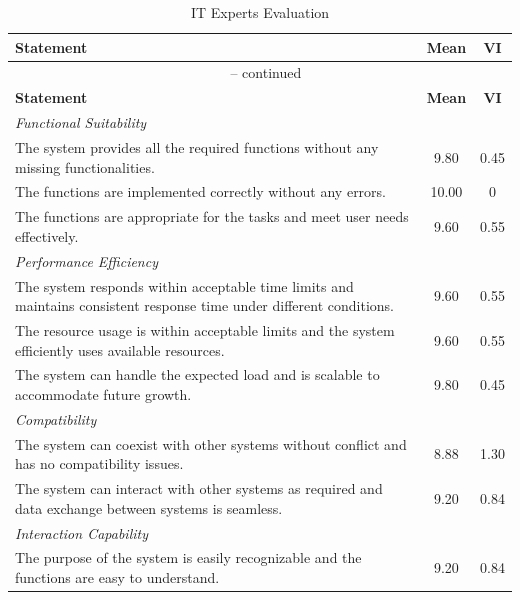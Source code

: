 \begin{appendices}
\begin{centerappendixtitle}
\begin{spacing}{1.3}
\begin{longtable}{p{12cm}cc}
	    \end{longtable}
		\end{spacing}
        
        \pagebreak
        \begin{spacing}{1.3}
		\begin{longtable}{p{12cm}cc}
			\caption{IT Experts Evaluation} \\
			\hline
			\textbf{Statement} & \textbf{Mean} & \textbf{VI} \\
			\hline
			\endfirsthead
			
			\multicolumn{3}{c}{{\tablename\ \thetable{} -- 
			continued}} \\
			\hline
			\textbf{Statement} & \textbf{Mean} & \textbf{VI} \\
			\hline
			\endhead
			  \multicolumn{2}{l}{\textit{Functional Suitability}} \\
			  The system provides all the required functions without any missing functionalities.
			  & 9.80 & 0.45  \\
			  The functions are implemented correctly without any errors.
			  & 10.00 & 0  \\
			  The functions are appropriate for the tasks and meet user needs effectively.
			  & 9.60 & 0.55  \\ \hline
			  \multicolumn{2}{l}{\textit{Performance Efficiency}} \\
			  The system responds within acceptable time limits and maintains consistent response time under different conditions.
			  & 9.60 & 0.55  \\
			  The resource usage is within acceptable limits and the system efficiently uses available resources.
			  & 9.60 & 0.55  \\
			  The system can handle the expected load and is scalable to accommodate future growth.
			  & 9.80 & 0.45  \\ \hline
			  \multicolumn{2}{l}{\textit{Compatibility}} \\
			  The system can coexist with other systems without conflict and has no compatibility issues.
			  & 8.88 & 1.30  \\
			  The system can interact with other systems as required and data exchange between systems is seamless.
			  & 9.20 & 0.84  \\ \hline
			  \multicolumn{2}{l}{\textit{Interaction Capability}} \\
			  The purpose of the system is easily recognizable and the functions are easy to understand.
			  & 9.20 & 0.84  \\

\end{longtable}
\end{spacing}
\end{centerappendixtitle}
\end{appendices}
